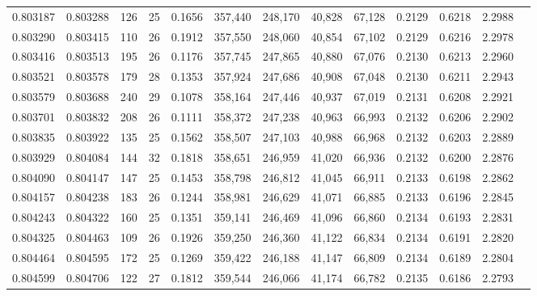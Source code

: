 \begin{tabular}{rrrrrrrrrrrrr}
0.803187 & 0.803288 &   126 &  25 &                                     0.1656 & 357,440 & 248,170 &  40,828 &  67,128 & 0.2129 & 0.6218 & 2.2988 \\
0.803290 & 0.803415 &   110 &  26 &                                     0.1912 & 357,550 & 248,060 &  40,854 &  67,102 & 0.2129 & 0.6216 & 2.2978 \\
0.803416 & 0.803513 &   195 &  26 &                                     0.1176 & 357,745 & 247,865 &  40,880 &  67,076 & 0.2130 & 0.6213 & 2.2960 \\
0.803521 & 0.803578 &   179 &  28 &                                     0.1353 & 357,924 & 247,686 &  40,908 &  67,048 & 0.2130 & 0.6211 & 2.2943 \\
0.803579 & 0.803688 &   240 &  29 &                                     0.1078 & 358,164 & 247,446 &  40,937 &  67,019 & 0.2131 & 0.6208 & 2.2921 \\
0.803701 & 0.803832 &   208 &  26 &                                     0.1111 & 358,372 & 247,238 &  40,963 &  66,993 & 0.2132 & 0.6206 & 2.2902 \\
0.803835 & 0.803922 &   135 &  25 &                                     0.1562 & 358,507 & 247,103 &  40,988 &  66,968 & 0.2132 & 0.6203 & 2.2889 \\
0.803929 & 0.804084 &   144 &  32 &                                     0.1818 & 358,651 & 246,959 &  41,020 &  66,936 & 0.2132 & 0.6200 & 2.2876 \\
0.804090 & 0.804147 &   147 &  25 &                                     0.1453 & 358,798 & 246,812 &  41,045 &  66,911 & 0.2133 & 0.6198 & 2.2862 \\
0.804157 & 0.804238 &   183 &  26 &                                     0.1244 & 358,981 & 246,629 &  41,071 &  66,885 & 0.2133 & 0.6196 & 2.2845 \\
0.804243 & 0.804322 &   160 &  25 &                                     0.1351 & 359,141 & 246,469 &  41,096 &  66,860 & 0.2134 & 0.6193 & 2.2831 \\
0.804325 & 0.804463 &   109 &  26 &                                     0.1926 & 359,250 & 246,360 &  41,122 &  66,834 & 0.2134 & 0.6191 & 2.2820 \\
0.804464 & 0.804595 &   172 &  25 &                                     0.1269 & 359,422 & 246,188 &  41,147 &  66,809 & 0.2134 & 0.6189 & 2.2804 \\
0.804599 & 0.804706 &   122 &  27 &                                     0.1812 & 359,544 & 246,066 &  41,174 &  66,782 & 0.2135 & 0.6186 & 2.2793 \\

\end{tabular}
